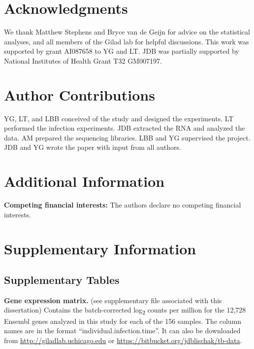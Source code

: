 \section{Acknowledgments}\label{acknowledgments}

We thank Matthew Stephens and Bryce van de Geijn for advice on the
statistical analyses, and all members of the Gilad lab for helpful
discussions. This work was supported by grant AI087658 to YG and LT. JDB
was partially supported by National Institutes of Health Grant T32
GM007197.

\section{Author Contributions}\label{author-contributions}

YG, LT, and LBB conceived of the study and designed the experiments. LT
performed the infection experiments. JDB extracted the RNA and analyzed
the data. AM prepared the sequencing libraries. LBB and YG supervised
the project. JDB and YG wrote the paper with input from all authors.

\section{Additional Information}\label{additional-information}

\textbf{Competing financial interests:} The authors declare no competing
financial interests.

\section{Supplementary Information}\label{supplementary-information}

\subsection{Supplementary Tables}\label{supplementary-tables}

\begin{table}
\caption[Gene expression matrix.]{\textbf{Gene expression matrix.}
  (see supplementary file associated with this dissertation)
  Contains the batch-corrected log\textsubscript{2} counts per million
  for the 12,728 Ensembl genes analyzed in this study for each of the
  156 samples. The column names are in the format
  ``individual.infection.time''. It can also be downloaded from
  \url{http://giladlab.uchicago.edu} or
  \url{https://bitbucket.org/jdblischak/tb-data}.}
\label{tab:s1}
\end{table}

